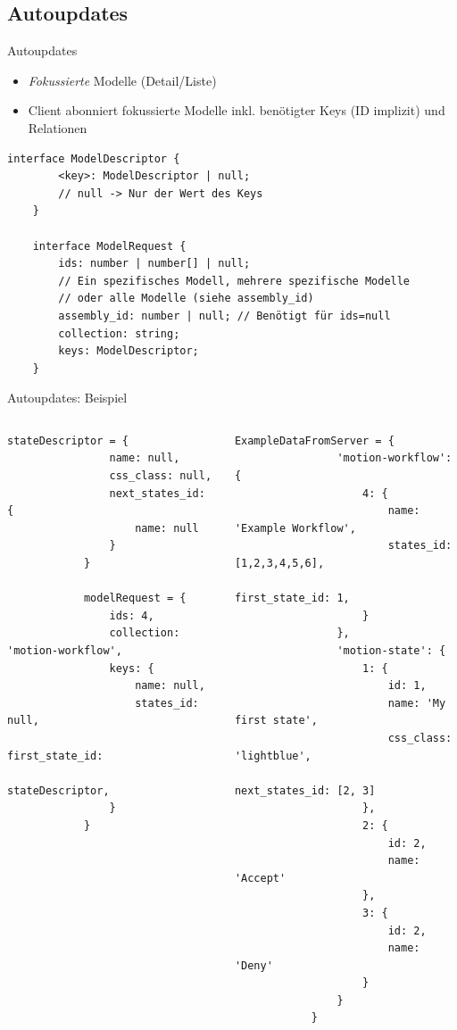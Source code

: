 \documentclass[10pt]{beamer}
\begin{document}
\subsection{Autoupdates}
\begin{frame}[fragile]{Autoupdates}
	\begin{itemize}
		\item \textit{Fokussierte} Modelle (Detail/Liste)
		\item Client abonniert fokussierte Modelle inkl. benötigter Keys (ID implizit) und Relationen
	\end{itemize}
	\begin{Verbatim}[tabsize=2]
	interface ModelDescriptor {
		<key>: ModelDescriptor | null;
		// null -> Nur der Wert des Keys
	}
	
	interface ModelRequest {
		ids: number | number[] | null;
		// Ein spezifisches Modell, mehrere spezifische Modelle
		// oder alle Modelle (siehe assembly_id)
		assembly_id: number | null; // Benötigt für ids=null
		collection: string;
		keys: ModelDescriptor;
	}
	\end{Verbatim}
\end{frame}
\begin{frame}[fragile]{Autoupdates: Beispiel}
	\footnotesize
	\begin{columns}
		\begin{column}{0.48\textwidth}
			\begin{Verbatim}[tabsize=2]
			stateDescriptor = {
				name: null,
				css_class: null,
				next_states_id: {
					name: null
				}
			}
			
			modelRequest = {
				ids: 4,
				collection: 'motion-workflow',
				keys: {
					name: null,
					states_id: null,
					first_state_id:
						stateDescriptor,
				}
			}
			\end{Verbatim}
		\end{column}
		\begin{column}{0.48\textwidth}  %
			\begin{Verbatim}[tabsize=2]
			ExampleDataFromServer = {
				'motion-workflow': {
					4: {
						name: 'Example Workflow',
						states_id: [1,2,3,4,5,6],
						first_state_id: 1,
					}
				},
				'motion-state': {
					1: {
						id: 1,
						name: 'My first state',
						css_class: 'lightblue',
						next_states_id: [2, 3]
					},
					2: {
						id: 2,
						name: 'Accept'
					},
					3: {
						id: 2,
						name: 'Deny'
					}
				}
			}
			\end{Verbatim}
		\end{column}
	\end{columns}
\end{frame}
\end{document}
